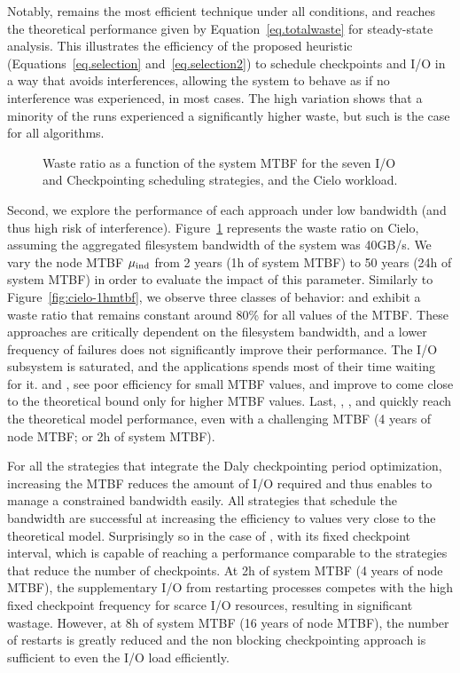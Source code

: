 Notably, \cooperative remains the most efficient technique under all
conditions, and reaches the theoretical performance given by
Equation~\eqref{eq.totalwaste} for steady-state analysis. This
illustrates the efficiency of the proposed heuristic
(Equations~\eqref{eq.selection} and~\eqref{eq.selection2}) to schedule
checkpoints and I/O in a way that avoids interferences, allowing the
system to behave as if no interference was experienced, in most
cases. The high variation shows that a minority of the runs
experienced a significantly higher waste, but such is the case for
all algorithms.

\begin{figure}
  \begin{center}
    \resizebox{\linewidth}{!}{}
  \end{center}
  \caption{Waste ratio as a function of the system MTBF for the
    seven I/O and Checkpointing scheduling strategies, and the Cielo
    workload. \label{fig:cielo-40gbs}}
\end{figure}

Second, we explore the performance of each approach under low
bandwidth (and thus high risk of interference).
Figure~\ref{fig:cielo-40gbs} represents the waste ratio on Cielo,
assuming the aggregated filesystem bandwidth of the system was
40GB/s. We vary the node MTBF $\mu_{\text{ind}}$ from 2 years (1h of system
MTBF) to 50 years (24h of system MTBF) in order to evaluate the impact
of this parameter. Similarly to Figure~\ref{fig:cielo-1hmtbf}, we
observe three classes of behavior: \propfixed and \bfifofixed exhibit
a waste ratio that remains constant around 80\% for all values of the
MTBF. These approaches are critically dependent on the filesystem
bandwidth, and a lower frequency of failures does not significantly
improve their performance. The I/O subsystem is saturated, and the
applications spends most of their time waiting for it.
%
\propdaly and \bfifodaly, see poor efficiency for small MTBF values,
and improve to come close to the theoretical bound only for higher
MTBF values. Last, \fifodaly,
\fifofixed, and \cooperative quickly reach the theoretical model
performance, even with a challenging MTBF (4 years of node MTBF; or 2h of
system MTBF).

For all the strategies that integrate the Daly checkpointing period
optimization, increasing the MTBF reduces the amount of I/O required
and thus enables to manage a constrained bandwidth easily. All
strategies that schedule the bandwidth are successful at increasing the
efficiency to values very close to the theoretical model.
%
Surprisingly so in the case of \fifofixed, with its fixed checkpoint
interval, which is capable of reaching a performance
comparable to the strategies that reduce the number of
checkpoints. At 2h of system MTBF (4 years of node MTBF), the
supplementary I/O from restarting processes competes with the high
fixed checkpoint frequency for scarce I/O resources, resulting in
significant wastage. However, at 8h of system MTBF (16 years of node
MTBF), the number of restarts is greatly reduced and the non blocking
checkpointing approach is sufficient to even the I/O load efficiently.

